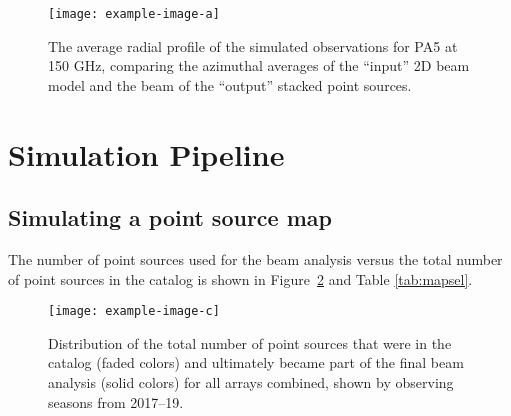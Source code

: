 \begin{figure}
\vspace{1em}
    \centering
    \texttt{[image: example-image-a]}
    \caption{The average radial profile of the simulated observations for PA5 at 150 GHz, comparing the azimuthal averages of the \enquote{input} 2D beam model and the beam of the \enquote{output} stacked point sources. 
    }
    \label{fig:bias_plot}
    \vspace{1em}
\end{figure}

\section{Simulation Pipeline}
\label{sec:pipe}

\subsection{Simulating a point source map}
\label{subsec:mapsel}


The number of point sources used for the beam analysis versus the total number of point sources in the catalog is shown in Figure~\ref{fig:obs_summary} and Table \ref{tab:mapsel}. 
\begin{figure}
\vspace{1em}
    \centering
    \texttt{[image: example-image-c]}
    \caption{Distribution of the total number of point sources that were in the catalog (faded colors) and ultimately became part of the final beam analysis (solid colors) for all arrays combined, shown by observing seasons from 2017--19. 
    }
    \label{fig:obs_summary}
    \vspace{1em}
\end{figure}

